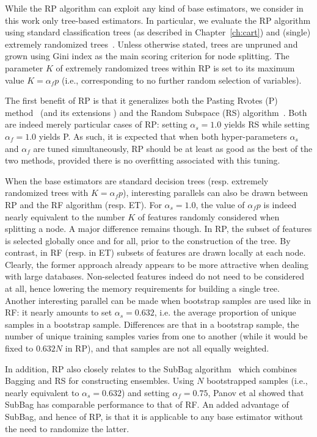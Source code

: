 While the RP algorithm can exploit any kind of base estimators, we consider in
this work only tree-based estimators. In particular, we evaluate the RP
algorithm using  standard classification trees (as described in
Chapter~\ref{ch:cart}) and (single) extremely randomized
trees~\citep{geurts:2006}. Unless otherwise stated, trees are unpruned and
grown using Gini index as the main scoring criterion for node splitting. The
parameter $K$ of extremely randomized trees within RP is set to its maximum
value $K=\alpha_f p$ (i.e., corresponding to no further random selection of
variables).

The first benefit of RP is that it generalizes both the Pasting Rvotes (P)
method~\citep{breiman:1999} (and its extensions \citep{chawla:2004,basilico:2011})
and the Random Subspace (RS) algorithm~\citep{ho:1998}. Both are indeed merely
particular cases of RP: setting $\alpha_s=1.0$ yields RS while setting
$\alpha_f=1.0$ yields P. As such, it is expected that when both
hyper-parameters $\alpha_s$ and $\alpha_f$ are tuned simultaneously, RP should be at
least as good as the best of the two methods, provided there is no overfitting
associated with this tuning.

When the base estimators are standard decision trees (resp. extremely
randomized trees with $K=\alpha_f p$), interesting parallels can also be
drawn between RP and the RF algorithm (resp. ET). For $\alpha_s=1.0$, the
value of $\alpha_f p$ is indeed nearly equivalent to the number $K$ of
features randomly considered when splitting a node. A major difference
remains though. In RP, the subset of features is selected globally
once and for all, prior to the construction of the tree. By contrast,
in RF (resp. in ET) subsets of features are drawn locally at each
node. Clearly, the former approach already appears to be more
attractive when dealing with large databases. Non-selected features
indeed do not need to be considered at all, hence lowering the memory
requirements for building a single tree. Another interesting parallel
can be made when bootstrap samples are used like in RF: it nearly
amounts to set $\alpha_s=0.632$, i.e. the average proportion of unique
samples in a bootstrap sample. Differences are that in a bootstrap
sample, the number of unique training samples varies from one to
another (while it would be fixed to $0.632 N$ in RP), and that
samples are not all equally weighted.

In addition, RP also closely relates to the SubBag algorithm~\citep{panov:2007}
which combines Bagging and RS for constructing ensembles. Using $N$
bootstrapped samples (i.e., nearly equivalent to $\alpha_s=0.632$) and setting
$\alpha_f=0.75$, Panov et al showed that SubBag has comparable performance to that of
RF. An added advantage of SubBag, and hence of RP, is that it is applicable to
any base estimator without the need to randomize the latter.

